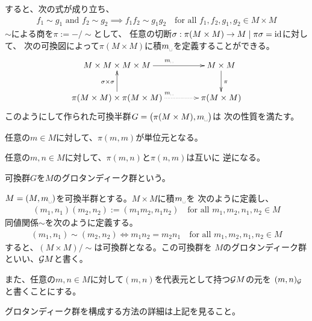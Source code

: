 	すると、次の式が成り立ち、
	\begin{equation*}\begin{split}
		f_1\sim g_1 \text{ and } f_2\sim g_2 \implies f_1f_2\sim g_1g_2
		\quad\text{for all }f_1,f_2,g_1,g_2\in M\times M
	\end{split}\end{equation*}
	$\sim$による商を$\pi:=-/\sim$として、
	任意の切断$\sigma:\pi(M\times M)\to M\;\vert\; \pi\sigma={\operatorname{id}}$に対して、
	次の可換図によって$\pi(M\times M)$に積$m_\myspace$を定義することができる。
	\begin{equation*}\xymatrix@C=4em{
		M\times M\times M\times M \ar[r]^{m_\myspace} & M\times M \ar[d]^\pi \\
		\pi(M\times M)\times \pi(M\times M) \ar@{.>}[r]^{m_\myspace}
			\ar[u]^{\sigma\times\sigma} & \pi(M\times M) \\
	}\end{equation*}
	このようにして作られた可換半群$G=\bigl(\pi(M\times M),m_\myspace\bigr)$は
	次の性質を満たす。
	\begin{description}\setlength{\itemsep}{-1mm} %
		\item[単位元] 任意の$m\in M$に対して、$\pi(m,m)$が単位元となる。
		\item[逆元] 任意の$m,n\in M$に対して、$\pi(m,n)$と$\pi(n,m)$は互いに
		逆になる。
	\end{description} %
	可換群$G$を$M$のグロタンディーク群という。

	\begin{definition}[グロタンディーク群]\label{def:グロタンディーク群} %
		$M=(M,m_\myspace)$を可換半群とする。$M\times M$に積$m_\myspace$を
		次のように定義し、
		\begin{equation*}\begin{split}
			(m_1,n_1)(m_2,n_2) := (m_1m_2,n_1n_2)
			\quad\text{for all }m_1,m_2,n_1,n_2\in M
		\end{split}\end{equation*}
		同値関係$\sim$を次のように定義する。
		\begin{equation*}\begin{split}
			(m_1,n_1)\sim(m_2,n_2) \iff m_1n_2=m_2n_1
			\quad\text{for all }m_1,m_2,n_1,n_2\in M
		\end{split}\end{equation*}
		すると、$(M\times M)/\sim$は可換群となる。この可換群を
		$M$のグロタンディーク群といい、${{\mathcal{G}}} M$と書く。

		また、任意の$m,n\in M$に対して$(m,n)$を代表元として持つ${{\mathcal{G}}} M$の元を
		$(m,n)_{{\mathcal{G}}}$と書くことにする。

		グロタンディーク群を構成する方法の詳細は上記を見ること。
	\end{definition} %

